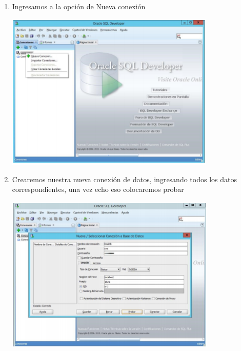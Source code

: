 \begin{enumerate}[1.]
	\hfill \break
	\hfill \break
	\hfill \break
	\hfill \break
	\hfill \break
	\hfill \break
	\hfill \break
	\hfill \break
	\item Ingresamos a la opci\'on de Nueva conexi\'on\\
	\begin{center}
	\includegraphics[width=10cm]{./Imagenes/angela26} 
	\end{center}

	\item Crearemos nuestra nueva conexi\'on de datos, ingresando todos los datos correspondientes, una vez echo eso colocaremos probar\\
	\begin{center}
	\includegraphics[width=10cm]{./Imagenes/angela27} 
	\end{center}


\end{enumerate}
